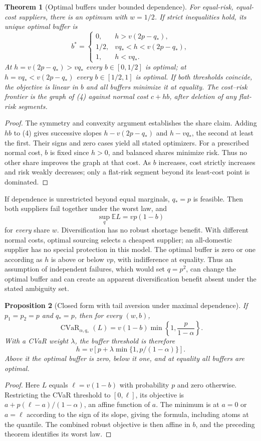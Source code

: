 \documentclass[11pt,a4paper]{article}
\newtheorem{theorem}{Theorem}[section]
\newtheorem{proposition}[theorem]{Proposition}
\theoremstyle{definition}
\theoremstyle{remark}
\newcommand{\E}{\mathbb E}
\begin{document}
\begin{theorem}[Optimal buffers under bounded dependence]
For equal-risk, equal-cost suppliers, there is an optimum with $w=1/2$. If strict inequalities hold, its unique optimal buffer is
\[
 b^*=\begin{cases}
 0,&h>v(2p-q_*),\\
 1/2,&vq_*<h<v(2p-q_*),\\
 1,&h<vq_*.
 \end{cases}
\]
At $h=v(2p-q_*)>vq_*$ every $b\in[0,1/2]$ is optimal; at $h=vq_*<v(2p-q_*)$ every $b\in[1/2,1]$ is optimal. If both thresholds coincide, the objective is linear in $b$ and all buffers minimize it at equality. The cost--risk frontier is the graph of (4) against normal cost $c+hb$, after deletion of any flat-risk segments.
\end{theorem}
\begin{proof}
The symmetry and convexity argument establishes the share claim. Adding $hb$ to (4) gives successive slopes $h-v(2p-q_*)$ and $h-vq_*$, the second at least the first. Their signs and zero cases yield all stated optimizers. For a prescribed normal cost, $b$ is fixed since $h>0$, and balanced shares minimize risk. Thus no other share improves the graph at that cost. As $b$ increases, cost strictly increases and risk weakly decreases; only a flat-risk segment beyond its least-cost point is dominated.
\end{proof}

If dependence is unrestricted beyond equal marginals, $q_*=p$ is feasible. Then both suppliers fail together under the worst law, and
\[
 \sup_q\E L=vp(1-b)
\]
for \emph{every} share $w$. Diversification has no robust shortage benefit. With different normal costs, optimal sourcing selects a cheapest supplier; an all-domestic supplier has no special protection in this model. The optimal buffer is zero or one according as $h$ is above or below $vp$, with indifference at equality. Thus an assumption of independent failures, which would set $q=p^2$, can change the optimal buffer and can create an apparent diversification benefit absent under the stated ambiguity set.

\begin{proposition}[Closed form with tail aversion under maximal dependence]
If $p_1=p_2=p$ and $q_*=p$, then for every $(w,b)$,
\[
 \operatorname{CVaR}_{\alpha,q_*}(L)
 =v(1-b)\min\left\{1,\frac p{1-\alpha}\right\}.
\]
With a CVaR weight $\lambda$, the buffer threshold is therefore
\[
 h=v\left[p+\lambda\min\{1,p/(1-\alpha)\}\right].
\]
Above it the optimal buffer is zero, below it one, and at equality all buffers are optimal.
\end{proposition}
\begin{proof}
Here $L$ equals $\ell=v(1-b)$ with probability $p$ and zero otherwise. Restricting the CVaR threshold to $[0,\ell]$, its objective is
$a+p(\ell-a)/(1-\alpha)$, an affine function of $a$. The minimum is at $a=0$ or $a=\ell$ according to the sign of its slope, giving the formula, including atoms at the quantile. The combined robust objective is then affine in $b$, and the preceding theorem identifies its worst law.
\end{proof}
\end{document}
